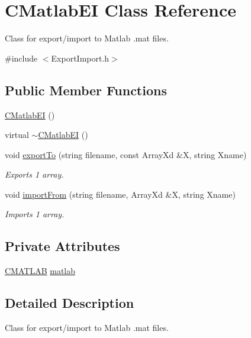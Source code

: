 \hypertarget{class_c_matlab_e_i}{\section{C\-Matlab\-E\-I Class Reference}
\label{class_c_matlab_e_i}
}


Class for export/import to Matlab .mat files.  




{\ttfamily \#include $<$Export\-Import.\-h$>$}

\subsection*{Public Member Functions}
\begin{DoxyCompactItemize}
\item 
\hyperlink{class_c_matlab_e_i_af54d760f0096c280975aba978c3d5761}{C\-Matlab\-E\-I} ()
\item 
virtual \hyperlink{class_c_matlab_e_i_a6535b4fe9fd9cc4c14cb097bb32dac7a}{$\sim$\-C\-Matlab\-E\-I} ()
\item 
void \hyperlink{class_c_matlab_e_i_a05cb4a989e7fe5ada9ef9b7be355734e}{export\-To} (string filename, const Array\-Xd \&X, string Xname)
\begin{DoxyCompactList}\small\item\em Exports 1 array. \end{DoxyCompactList}\item 
void \hyperlink{class_c_matlab_e_i_a9a174ecbc34b250c775f3040f69cbc21}{import\-From} (string filename, Array\-Xd \&X, string Xname)
\begin{DoxyCompactList}\small\item\em Imports 1 array. \end{DoxyCompactList}\end{DoxyCompactItemize}
\subsection*{Private Attributes}
\begin{DoxyCompactItemize}
\item 
\hyperlink{class_c_m_a_t_l_a_b}{C\-M\-A\-T\-L\-A\-B} \hyperlink{class_c_matlab_e_i_a0955750e2047d7cbe79b488342c73a72}{matlab}
\end{DoxyCompactItemize}


\subsection{Detailed Description}
Class for export/import to Matlab .mat files. 

